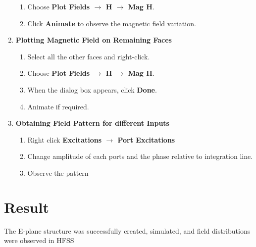 \documentclass[11pt, a4paper]{article}
\begin{document}
\begin{multicols}{2}
\begin{enumerate}[leftmargin=*, itemsep=15pt]
\begin{enumerate}
			\item Choose \textbf{Plot Fields $\rightarrow$ H $\rightarrow$ Mag H}.
			\item Click \textbf{Animate} to observe the magnetic field variation.
		\end{enumerate}
	\item \textbf{Plotting Magnetic Field on Remaining Faces}
		\begin{enumerate}
		\item Select all the other faces and right-click.
			\item Choose \textbf{Plot Fields $\rightarrow$ H $\rightarrow$ Mag H}.
			\item When the dialog box appears, click \textbf{Done}.
			\item Animate if required.
		\end{enumerate}
    \item \textbf{Obtaining Field Pattern for different Inputs}
        \begin{enumerate}
            \item Right click \textbf{Excitations $\rightarrow$ Port Excitations}
            \item Change amplitude of each ports and the phase relative to integration line.
            \item Observe the pattern
        \end{enumerate}
\end{enumerate}
\section*{Result}
The E-plane structure was successfully created,
simulated, and field distributions were observed in
HFSS
\end{multicols}
\end{document}
